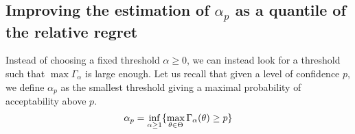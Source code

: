 \documentclass[../../Main_ManuscritThese.tex]{subfiles}
\begin{document}



\clearpage

\subsection{Improving the estimation of $\alpha_p$ as a quantile of the relative regret}
\label{sec:quantile_rr}
Instead of choosing a fixed threshold $\alpha \geq 0$, we can instead look for a threshold such that $\max \Gamma_{\alpha}$ is large enough.
Let us recall that given a level of confidence $p$, we define $\alpha_p$ as the smallest threshold giving a maximal probability of acceptability above $p$.
\begin{equation}
  \alpha_p = \inf_{\alpha \geq 1}\{\max_{\theta \in \Theta}\Gamma_{\alpha}(\theta)\geq p \}
\end{equation}
\end{document}
